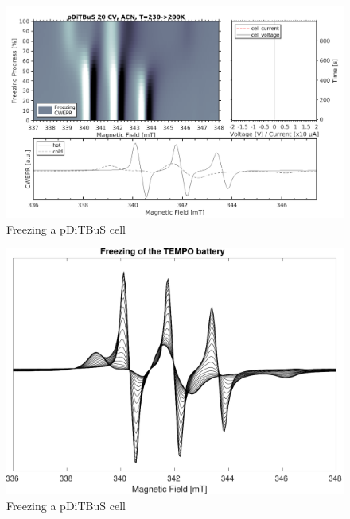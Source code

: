 \begin{figure}[h]
\center
	\includegraphics[width=1\textwidth]{./operando_epr/figures/CRYO/SANDWICH_FREEZING.pdf}
	\caption{Freezing a pDiTBuS cell}
	\label{fig:operando_cold_battery}
\end{figure}


\begin{figure}[h]
\center
	\includegraphics[width=1\textwidth]{./operando_epr/figures/CRYO/freezing_sandwich_230K_200K.pdf}
	\caption{Freezing a pDiTBuS cell}
	\label{fig:freezing_of_pditbus_battery_1D}
\end{figure}


